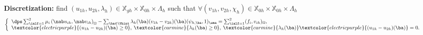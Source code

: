 \documentclass[10 pt]{beamer}
\begin{document}
\begin{frame}
\begin{itemize}
\end{itemize}
\vspace{0.5 cm}
\textbf{Discretization:}
find $(u_{1h},u_{2h},\lambda_h)\in {\mathbb{X}}_{gh} \times {\mathbb{X}}_{0h} \times \Lambda_h$  such that $\forall (v_{1h},v_{2h}, \chi_h) \in {\mathbb{X}}_{0h} \times {\mathbb{X}}_{0h} \times \Lambda_h$
\begin{equation*}
\left\lbrace\begin{array}{llccc}
\dps \sum_{\ialf=1}^2 \mu_i \left(\nab u_{ih},\nab v_{ih}\right)_{\Omega} - \sum_{{\ba}\in \Vhint} \lambda_h({\ba})(v_{1h}-v_{2h})({\ba}) (\psi_{h,\ba}, 1)_{\oma}= \sum_{\ialf=1}^2 (f_i,v_{ih})_{\Omega}, \\
\textcolor{electricpurple}{(u_{1h}-u_{2h})(\ba) \geq 0}, \: \textcolor{carmine}{\lambda_h(\ba) \geq 0}, \: \textcolor{carmine}{\lambda_h(\ba)} \textcolor{electricpurple}{(u_{1h}-u_{2h})(\ba)}=0.
\end{array}
\right.
\end{equation*}
\end{frame}
\end{document}
